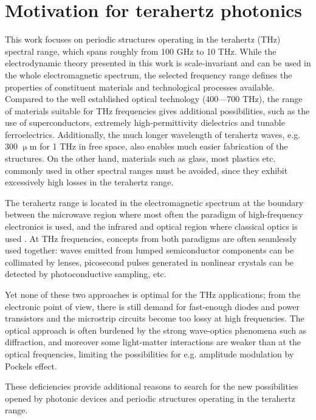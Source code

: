 \section{Motivation for terahertz photonics}
This work focuses on periodic structures operating in the terahertz (THz) spectral range, which spans roughly from 100 GHz to 10 THz. While the electrodynamic theory presented in this work is scale-invariant and can be used in the whole electromagnetic spectrum, the selected frequency range defines the properties of constituent materials and technological processes available. Compared to the well established optical technology (400---700 THz), the range of materials suitable for THz frequencies gives additional possibilities, such as the use of superconductors, extremely high-permittivity dielectrics and tunable ferroelectrics. Additionally, the much longer wavelength of terahertz waves, e.g. 300 $\upmu$m for 1 THz in free space, also enables much easier fabrication of the structures. On the other hand, materials such as glass, most plastics etc. commonly used in other spectral ranges must be avoided, since they exhibit excessively high losses in the terahertz range.

The terahertz range is located in the electromagnetic spectrum at the boundary between the microwave region where most often the paradigm of high-frequency electronics is used, and the infrared and optical region where classical optics is used \cite{ozyuzer2007emission}. At THz frequencies, concepts from both paradigms are often seamlessly used together: waves emitted from lumped semiconductor components can be collimated by lenses, picosecond pulses generated in nonlinear crystals can be detected by photoconductive sampling, etc.  %

Yet none of these two approaches is optimal for the THz applications; from the electronic point of view, there is still demand for fast-enough diodes and power transistors and the microstrip circuits become too lossy at high frequencies. The optical approach is often burdened by the strong wave-optics phenomena such as diffraction, and moreover some light-matter interactions are weaker than at the optical frequencies, limiting the possibilities for e.g. amplitude modulation by Pockels effect. 

These deficiencies provide additional reasons to search for the new possibilities opened by photonic devices and periodic structures operating in the terahertz range.  

